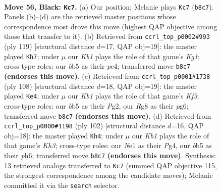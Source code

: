 \documentclass[11pt]{article}
\begin{document}
\clearpage

\begin{figure}[p]\centering
\begin{subfigure}{0.46\textwidth}\centering
\resizebox{\linewidth}{!}{%
\newchessgame
\chessboard[
  setfen={1k4r1/p7/Pp5R/1B3p2/5P2/4K3/8/4n3 b - - 4 56},
  showmover=false,
  pgfstyle=straightmove, color=movearrow, markmove={b8-c7}
]}
\caption{}
\end{subfigure}\hfill
\begin{subfigure}{0.46\textwidth}\centering
\resizebox{\linewidth}{!}{%
\newchessgame
\chessboard[
  setfen={1r4k1/6p1/R4p2/4p3/4P2P/5P1K/8/8 b - - 46 60},
  showmover=false,
  pgfstyle=straightmove, color=movearrow, markmove={g8-h7}
]}
\caption{}
\end{subfigure}
\\[4pt]
\begin{subfigure}{0.46\textwidth}\centering
\resizebox{\linewidth}{!}{%
\newchessgame
\chessboard[
  setfen={8/PR6/4k1p1/4p2p/7P/5K2/6P1/r7 w - - 23 55},
  showmover=false,
  pgfstyle=straightmove, color=movearrow, markmove={f3-e4}
]}
\caption{}
\end{subfigure}\hfill
\begin{subfigure}{0.46\textwidth}\centering
\resizebox{\linewidth}{!}{%
\newchessgame
\chessboard[
  setfen={6k1/6p1/7p/r6P/6P1/1R5K/5P2/8 w - - 7 52},
  showmover=false,
  pgfstyle=straightmove, color=movearrow, markmove={h3-h4}
]}
\caption{}
\end{subfigure}
\caption{\textbf{Move 56, Black: \texttt{Kc7}.} (a) Our position; Melanie plays \texttt{Kc7} (\texttt{b8c7}). Panels (b)--(d) are the retrieved master positions whose correspondence most drove this move (highest QAP objective among those that transfer to it). (b) Retrieved from \texttt{ccrl\_top\_p0002\#993} (ply 119) [structural distance $d$=17, QAP obj=19]: the master played \texttt{Kh7}; under $\mu$ our \emph{Kb1} plays the role of that game's \emph{Kg1}; cross-type roles: our \emph{b}b5 as their \emph{p}e4; transferred move \texttt{b8c7} \textbf{(endorses this move)}. (c) Retrieved from \texttt{ccrl\_top\_p0001\#1738} (ply 108) [structural distance $d$=18, QAP obj=19]: the master played \texttt{Ke4}; under $\mu$ our \emph{Kb1} plays the role of that game's \emph{Kf3}; cross-type roles: our \emph{b}b5 as their \emph{P}g2, our \emph{R}g8 as their \emph{p}g6; transferred move \texttt{b8c7} \textbf{(endorses this move)}. (d) Retrieved from \texttt{ccrl\_top\_p0000\#1198} (ply 102) [structural distance $d$=16, QAP obj=18]: the master played \texttt{Kh4}; under $\mu$ our \emph{Kb1} plays the role of that game's \emph{Kh3}; cross-type roles: our \emph{N}e1 as their \emph{P}g4, our \emph{b}b5 as their \emph{p}h6; transferred move \texttt{b8c7} \textbf{(endorses this move)}. Synthesis: 13 retrieved analogs transferred to \texttt{Kc7} (summed QAP objective 115, the strongest correspondence among the candidate moves); Melanie committed it via the \texttt{search} selector.}
\label{fig:thought-m111}
\end{figure}
\end{document}
